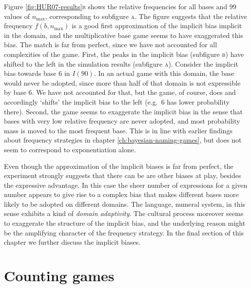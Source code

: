 \documentclass{../src/bcthesispart}
\begin{document}
Figure \ref{fig:HUR07-results}\textsc{b} shows the relative frequencies for all bases and 99 values of $n_{\text{max}}$, corresponding to subfigure  \textsc{a}.
The figure suggests that the relative frequency $f(b, n_{\text{max}})$ is a good first approximation of the implicit bias implicit in the domain, and the multiplicative base game seems to have exaggerated this bias.
The match is far from perfect, since we have not accounted for all complexities of the game.
First, the peaks in the implicit bias (subfigure \textsc{b}) have shifted to the left in the simulation results (subfigure \textsc{a}).
Consider the implicit bias towards base 6 in $I(90)$.
In an actual game with this domain, the base would never be adopted, since more than half of that domain is not expressible by base 6.
We have not accounted for that, but the game, of course, does and accordingly ‘shifts’ the implicit bias to the left (e.g.~6 has lower probability there).
Second, the game seems to exaggerate the implicit bias in the sense that bases with very low relative frequency are never adopted, and most probability mass is moved to the most frequent base.
This is in line with earlier findings about frequency strategies in chapter \ref{ch:bayesian-naming-games}, but does not seem to correspond to exponentiation alone.





Even though the approximation of the implicit biases is far from perfect, the experiment strongly suggests that there can be are other biases at play, besides the expressive advantage.
In this case the sheer number of expressions for a given number appears to give rise to a complex bias that makes different bases more likely to be adopted on different domains.
The language, numeral system, in this sense exhibits a kind of \emph{domain adaptivity}. 
The cultural process moreover seems to exaggerate the structure of the implicit bias, and the underlying reason might be the amplifying character of the frequency strategy.
In the final section of this chapter we further discuss the implicit biases.


\section{Counting games}
\end{document}
